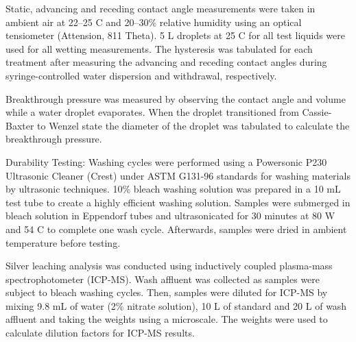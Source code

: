 \documentclass[10pt,letterpaper]{article}
\begin{document}
Static, advancing and receding contact angle measurements were taken in ambient air at 22–25 \degree C and 20–30\% relative humidity using an optical tensiometer (Attension, 811 Theta). 5 \micro L droplets at 25 \degree C for all test liquids were used for all wetting measurements. The hysteresis was tabulated for each treatment after measuring the advancing and receding contact angles during syringe-controlled water dispersion and withdrawal, respectively.

Breakthrough pressure was measured by observing the contact angle and volume while a water droplet evaporates. When the droplet transitioned from Cassie-Baxter to Wenzel state the diameter of the droplet was tabulated to calculate the breakthrough pressure.





Durability Testing: Washing cycles were performed using a Powersonic P230 Ultrasonic Cleaner (Crest) under ASTM G131-96 standards for washing materials by ultrasonic techniques. 10\% bleach washing solution was prepared in a 10 mL test tube to create a highly efficient washing solution. Samples were submerged in bleach solution in Eppendorf tubes and ultrasonicated for 30 minutes at 80 W and 54 \degree C to complete one wash cycle. Afterwards, samples were dried in ambient temperature before testing.

Silver leaching analysis was conducted using inductively coupled plasma-mass spectrophotometer (ICP-MS). Wash affluent was collected as samples were subject to bleach washing cycles. Then, samples were diluted for ICP-MS by mixing 9.8 mL of water (2\% nitrate solution), 10 \micro L of standard and 20 \micro L of wash affluent and taking the weights using a microscale. The weights were used to calculate dilution factors for ICP-MS results. 
\end{document}
